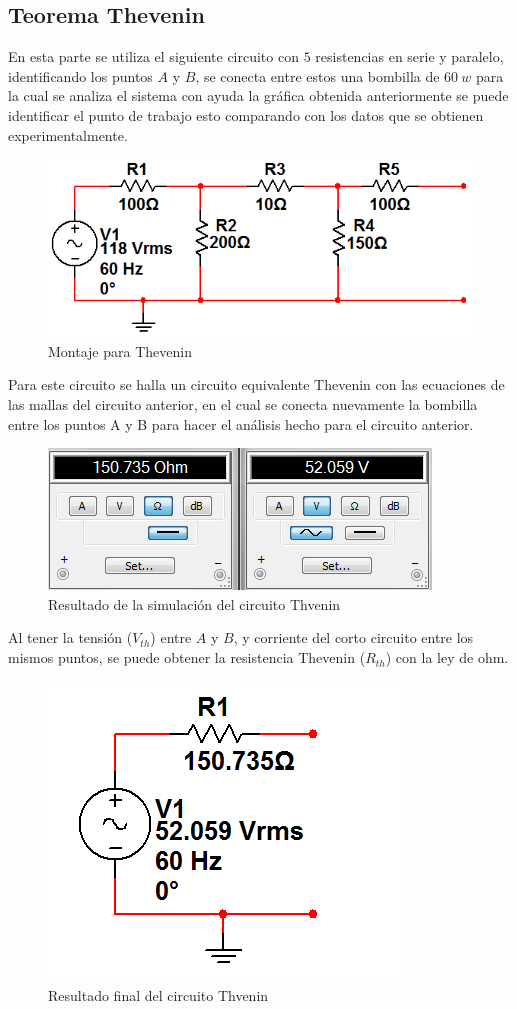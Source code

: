 \documentclass[twocolumn]{IEEEtran}
\begin{document}
\subsection{Teorema Thevenin}
\noindent
En esta parte se utiliza el siguiente circuito con $5$ resistencias en serie y paralelo, identificando los puntos $A$ y $B$,  se conecta entre estos una bombilla de $60 \ w$ para la cual se analiza el sistema  con ayuda la gráfica obtenida anteriormente se puede identificar el punto de trabajo esto comparando con los datos que se obtienen experimentalmente.
\begin{figure}[H]
	\centering
		\includegraphics[scale=0.4]{m3.png}
	\caption{Montaje para Thevenin}
	\label{fig5}
\end{figure}
\noindent
Para este circuito se halla un circuito equivalente Thevenin con las ecuaciones de las mallas del circuito anterior, en el cual se conecta nuevamente la bombilla entre los puntos A y B para hacer el análisis hecho para el circuito anterior.
\begin{figure}[H]
	\centering
		\includegraphics[scale=0.5]{r1.png}
	\caption{Resultado de la simulación del circuito Thvenin}
	\label{fig6}
\end{figure}
\noindent
Al tener la tensión ($V_{th}$) entre $A$ y $B$, y corriente del corto circuito entre los mismos puntos, se puede obtener la resistencia Thevenin ($R_{th}$) con la ley de ohm.
\begin{figure}[H]
	\centering
		\includegraphics[scale=0.5]{th3.png}
	\caption{Resultado final del circuito Thvenin}
	\label{fig7}
\end{figure}
\end{document}
